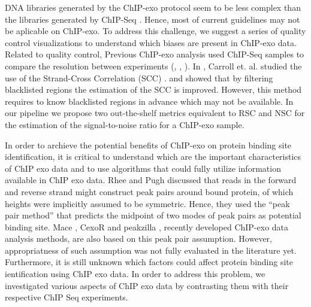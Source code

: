 \documentclass{bmcart}\usepackage[]{graphicx}\usepackage[]{color}
\begin{document}
DNA libraries generated by the ChIP-exo protocol seem to be less
complex than the libraries generated by ChIP-Seq
\cite{exo_review}. Hence, most of current guidelines \cite{encode_qc}
may not be aplicable on ChIP-exo. To address this challenge, we
suggest a series of quality control visualizations to understand which
biases are present in ChIP-exo data. Related to quality control,
Previous ChIP-exo analysis used ChIP-Seq samples to compare the
resolution between experiments (\cite{exo1}, \cite{exo2},
\cite{exoillumina}). In \cite{carroll.qc}, Carroll et. al. studied the
use of the Strand-Cross Correlation (SCC) \cite{strandcc}. and showed
that by filtering blacklisted regions the estimation of the SCC is
improved. However, this method requires to know blacklisted regions in
advance which may not be available. In our pipeline we propose two
out-the-shelf metrics equivalent to RSC and NSC for the estimation of
the signal-to-noise ratio for a ChIP-exo sample.

In order to archieve the potential benefits of ChIP-exo on protein
binding site identification, it is critical to understand which are
the important characteristics of ChIP exo data and to use algorithms
that could fully utilize information available in ChIP exo data. Rhee
and Pugh \cite{exo1} discussed that reads in the forward and reverse
strand might construct peak pairs around bound protein, of which
heights were implicitly assumed to be symmetric. Hence, they used the
``peak pair method'' that predicts the midpoint of two modes of peak
pairs as potential binding site. Mace \cite{mace}, CexoR \cite{cexor}
and peakzilla \cite{peakzilla}, recently developed ChIP-exo data
analysis methods, are also based on this peak pair
assumption. However, appropriatness of such assumption was not fully
evaluated in the literature yet.  Furthermore, it is still unknown
which factors could affect protein binding site ientification using
ChIP exo data. In order to address this problem, we investigated
various aspects of ChIP exo data by contrasting them with their
respective ChIP Seq experiments.
\end{document}
